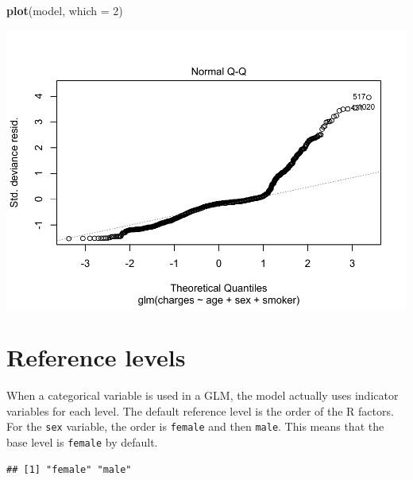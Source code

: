 \documentclass[openany]{book}
\newenvironment{Shaded}{\begin{snugshade}}{\end{snugshade}}
\newcommand{\DataTypeTok}[1]{\textcolor[rgb]{0.13,0.29,0.53}{#1}}
\newcommand{\DecValTok}[1]{\textcolor[rgb]{0.00,0.00,0.81}{#1}}
\newcommand{\KeywordTok}[1]{\textcolor[rgb]{0.13,0.29,0.53}{\textbf{#1}}}
\newcommand{\NormalTok}[1]{#1}
\newcommand{\OperatorTok}[1]{\textcolor[rgb]{0.81,0.36,0.00}{\textbf{#1}}}
\newcommand{\StringTok}[1]{\textcolor[rgb]{0.31,0.60,0.02}{#1}}
\begin{document}
\begin{Shaded}
\begin{Highlighting}[]
\KeywordTok{plot}\NormalTok{(model, }\DataTypeTok{which =} \DecValTok{2}\NormalTok{)}
\end{Highlighting}
\end{Shaded}

\includegraphics{05-linear-models_files/figure-latex/unnamed-chunk-18-1.pdf}

\hypertarget{reference-levels}{%
\section{Reference levels}\label{reference-levels}}

When a categorical variable is used in a GLM, the model actually uses indicator variables for each level. The default reference level is the order of the R factors. For the \texttt{sex} variable, the order is \texttt{female} and then \texttt{male}. This means that the base level is \texttt{female} by default.

\begin{Shaded}
\end{Shaded}

\begin{verbatim}
## [1] "female" "male"
\end{verbatim}
\end{document}
